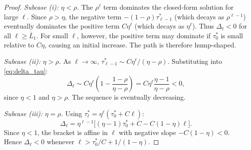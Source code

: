 \begin{proof}
\textit{Subcase (i): $\eta < \rho$.} The $\rho^{\ell}$ term dominates the closed-form solution for large $\ell$. Since $\rho > \eta$, the negative term $-(1-\rho)\tau^{*}_{\ell-1}$ (which decays as $\rho^{\ell-1}$) eventually dominates the positive term $C\eta^{\ell}$ (which decays as $\eta^{\ell}$). Thus $\Delta_{\ell} < 0$ for all $\ell \geq \bar{L}_1$. For small $\ell$, however, the positive term may dominate if $\tau^{*}_{0}$ is small relative to $C\eta$, causing an initial increase. The path is therefore hump-shaped.

\textit{Subcase (ii): $\eta > \rho$.} As $\ell \to \infty$, $\tau^{*}_{\ell-1} \sim C\eta^{\ell}/(\eta-\rho)$. Substituting into \eqref{eq:delta_tau}:
\begin{equation*}
\Delta_{\ell} \sim C\eta^{\ell}\left(1 - \frac{1-\rho}{\eta-\rho}\right) = C\eta^{\ell}\frac{\eta - 1}{\eta - \rho} < 0,
\end{equation*}
since $\eta < 1$ and $\eta > \rho$. The sequence is eventually decreasing.

\textit{Subcase (iii): $\eta = \rho$.} Using $\tau^{*}_{\ell} = \eta^{\ell}(\tau^{*}_{0} + C\ell)$:
\begin{equation*}
\Delta_{\ell} = \eta^{\ell-1}\bigl[(\eta-1)\tau^{*}_{0} + C - C(1-\eta)\ell\bigr].
\end{equation*}
Since $\eta < 1$, the bracket is affine in $\ell$ with negative slope $-C(1-\eta) < 0$. Hence $\Delta_{\ell} < 0$ whenever $\ell > \tau^{*}_{0}/C + 1/(1-\eta)$.
\end{proof}

